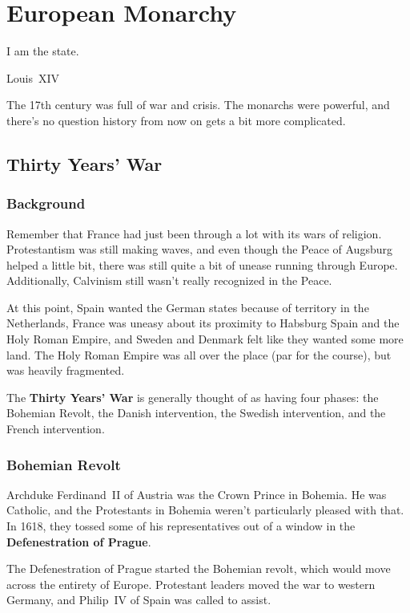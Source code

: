 \chapter{European Monarchy}

\epigraph{%
  I am the state.
}{Louis~XIV}

The 17th century was full of war and crisis.
The monarchs were powerful, and there's no question history from now on gets a bit more complicated.

\section{Thirty Years' War}

\subsection*{Background}

Remember that France had just been through a lot with its wars of religion.
Protestantism was still making waves, and even though the Peace of Augsburg helped a little bit,
there was still quite a bit of unease running through Europe.
Additionally, Calvinism still wasn't really recognized in the Peace.

At this point,
Spain wanted the German states because of territory in the Netherlands,
France was uneasy about its proximity to Habsburg Spain and the Holy Roman Empire,
and Sweden and Denmark felt like they wanted some more land.
The Holy Roman Empire was all over the place (par for the course), but was heavily fragmented.

The \textbf{Thirty Years' War} is generally thought of as having four phases:
the Bohemian Revolt,
the Danish intervention,
the Swedish intervention,
and the French intervention.

\subsection*{Bohemian Revolt}

Archduke Ferdinand~II of Austria was the Crown Prince in Bohemia.
He was Catholic, and the Protestants in Bohemia weren't particularly pleased with that.
In 1618, they tossed some of his representatives out of a window in the \textbf{Defenestration of Prague}.

The Defenestration of Prague started the Bohemian revolt, which would move across the entirety of Europe.
Protestant leaders moved the war to western Germany, and Philip~IV of Spain was called to assist.

